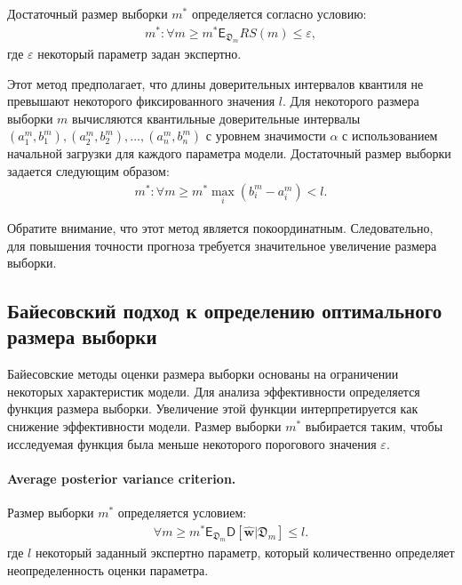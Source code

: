 Достаточный размер выборки $m^*$ определяется согласно условию:
\[
\label{eq:hb:7}
\begin{aligned}
	m^*: \forall m \geq m^* \mathsf{E}_{\mathfrak{D}_{m}}RS(m) \leq \varepsilon,
\end{aligned}
\]
где $\varepsilon$ некоторый параметр задан экспертно.

Этот метод предполагает, что длины доверительных интервалов квантиля не превышают некоторого фиксированного значения $l$. Для некоторого размера выборки $m$ вычисляются квантильные доверительные интервалы $\left (a^m_1, b^m_1\right), \left(a^m_2, b^m_2 \right), ..., \left(a^m_n, b^m_n \right)$ с уровнем значимости $\alpha$ с использованием начальной загрузки для каждого параметра модели. Достаточный размер выборки задается следующим образом:
\[
\label{eq:hb:8}
\begin{aligned}
	m^*: \forall m\geq m^* \max_i\left(b^m_i - a^m_i\right) < l.
\end{aligned}
\]
    
Обратите внимание, что этот метод является покоординатным. Следовательно, для повышения точности прогноза требуется значительное увеличение размера выборки.
    
\subsection{Байесовский подход к определению оптимального размера выборки}
Байесовские методы оценки размера выборки основаны на ограничении некоторых характеристик модели. Для анализа эффективности определяется функция размера выборки. Увеличение этой функции интерпретируется как снижение эффективности модели. Размер выборки $m^*$ выбирается таким, чтобы исследуемая функция была меньше некоторого порогового значения $\varepsilon$.

\paragraph{Average posterior variance criterion.}
Размер выборки $m^*$ определяется условием:
\[
\label{eq:bs:1}
\begin{aligned}
	\forall m \geq m^*    \mathsf{E}_{\mathfrak{D}_m}\mathsf{D}\left[\hat{\textbf{w}}|\mathfrak{D}_m\right] \leq l.
\end{aligned}
\]
где $l$ некоторый заданный экспертно параметр, который количественно определяет неопределенность оценки параметра.

